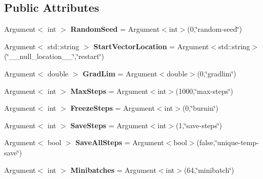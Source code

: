 \subsection*{Public Attributes}
\begin{DoxyCompactItemize}
\item 
\mbox{\label{classCommandArgs_a7227f10097dae1825feea951fc3132a6}} 
Argument$<$ int $>$ {\bfseries Random\+Seed} = Argument$<$int$>$(0,\char`\"{}random-\/seed\char`\"{})
\item 
\mbox{\label{classCommandArgs_acaf9e3be3c41eeb7f3fe61d26312a0ad}} 
Argument$<$ std\+::string $>$ {\bfseries Start\+Vector\+Location} = Argument$<$std\+::string$>$(\char`\"{}\+\_\+\+\_\+null\+\_\+location\+\_\+\+\_\+\char`\"{},\char`\"{}restart\char`\"{})
\item 
\mbox{\label{classCommandArgs_a47a53ea373bc6c81ed80c2b651e9c405}} 
Argument$<$ double $>$ {\bfseries Grad\+Lim} = Argument$<$double$>$(0,\char`\"{}gradlim\char`\"{})
\item 
\mbox{\label{classCommandArgs_a9d8b6a8c21f7b330979c7a173994ca37}} 
Argument$<$ int $>$ {\bfseries Max\+Steps} = Argument$<$int$>$(1000,\char`\"{}max-\/steps\char`\"{})
\item 
\mbox{\label{classCommandArgs_aedd3311893f45b92b4a7f598792f7f2e}} 
Argument$<$ int $>$ {\bfseries Freeze\+Steps} = Argument$<$int$>$(0,\char`\"{}burnin\char`\"{})
\item 
\mbox{\label{classCommandArgs_af906f01863ff7b503914b462a8a7ddb5}} 
Argument$<$ int $>$ {\bfseries Save\+Steps} = Argument$<$int$>$(1,\char`\"{}save-\/steps\char`\"{})
\item 
\mbox{\label{classCommandArgs_ad1018830dc6772a972df87a843059416}} 
Argument$<$ bool $>$ {\bfseries Save\+All\+Steps} = Argument$<$bool$>$(false,\char`\"{}unique-\/temp-\/save\char`\"{})
\item 
\mbox{\label{classCommandArgs_ad16d6cadaedb80e8d3abfc51b3b73335}} 
Argument$<$ int $>$ {\bfseries Minibatches} = Argument$<$int$>$(64,\char`\"{}minibatch\char`\"{})
\item 

\end{DoxyCompactItemize}
